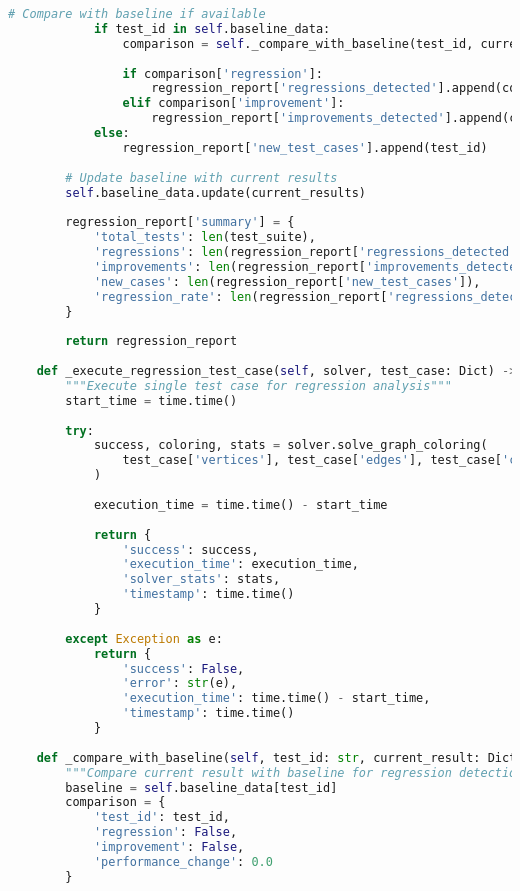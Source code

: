 \begin{lstlisting}[language=Python, caption=Regression Testing Framework]
            # Compare with baseline if available
            if test_id in self.baseline_data:
                comparison = self._compare_with_baseline(test_id, current_result)
                
                if comparison['regression']:
                    regression_report['regressions_detected'].append(comparison)
                elif comparison['improvement']:
                    regression_report['improvements_detected'].append(comparison)
            else:
                regression_report['new_test_cases'].append(test_id)
        
        # Update baseline with current results
        self.baseline_data.update(current_results)
        
        regression_report['summary'] = {
            'total_tests': len(test_suite),
            'regressions': len(regression_report['regressions_detected']),
            'improvements': len(regression_report['improvements_detected']),
            'new_cases': len(regression_report['new_test_cases']),
            'regression_rate': len(regression_report['regressions_detected']) / max(len(test_suite), 1)
        }
        
        return regression_report
    
    def _execute_regression_test_case(self, solver, test_case: Dict) -> Dict:
        """Execute single test case for regression analysis"""
        start_time = time.time()
        
        try:
            success, coloring, stats = solver.solve_graph_coloring(
                test_case['vertices'], test_case['edges'], test_case['colors'], timeout=30.0
            )
            
            execution_time = time.time() - start_time
            
            return {
                'success': success,
                'execution_time': execution_time,
                'solver_stats': stats,
                'timestamp': time.time()
            }
            
        except Exception as e:
            return {
                'success': False,
                'error': str(e),
                'execution_time': time.time() - start_time,
                'timestamp': time.time()
            }
    
    def _compare_with_baseline(self, test_id: str, current_result: Dict) -> Dict:
        """Compare current result with baseline for regression detection"""
        baseline = self.baseline_data[test_id]
        comparison = {
            'test_id': test_id,
            'regression': False,
            'improvement': False,
            'performance_change': 0.0
        }
        

\end{lstlisting}
